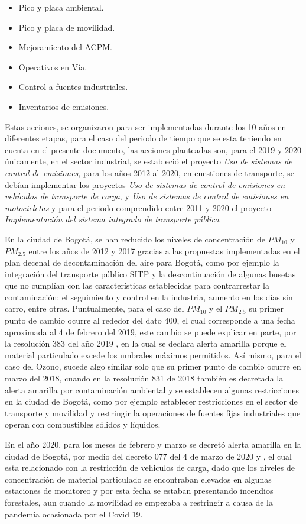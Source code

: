 \begin{itemize}
\item Pico y placa ambiental.
\item Pico y placa de movilidad. 
\item Mejoramiento del ACPM.
\item Operativos en Vía.
\item Control a fuentes industriales.
\item Inventarios de emisiones. 
\end{itemize}

Estas acciones, se organizaron para ser implementadas durante los 10 años en diferentes etapas, para el caso del periodo de tiempo que se esta teniendo en cuenta en el presente documento, las acciones planteadas son, para el 2019 y 2020 únicamente, en el sector industrial, se estableció el proyecto \textit{Uso de sistemas de control
de emisiones}, para los años 2012 al 2020, en cuestiones de transporte, se debían implementar los proyectos \textit{Uso de sistemas de control de emisiones en vehículos de transporte de carga}, y \textit{Uso de sistemas de control 
de emisiones en motocicletas} y para el periodo comprendido entre 2011 y 2020 el proyecto \textit{Implementación del sistema
integrado de transporte
público}. 

En la ciudad de Bogotá, se han reducido los niveles de concentración de $PM_{10}$ y $PM_{2.5}$ entre los años de 2012 y 2017 gracias a las propuestas implementadas en el plan decenal de decontaminación del aire para Bogotá, como por ejemplo la integración del transporte público SITP y la descontinuación de algunas busetas que no cumplían con las características establecidas para contrarrestar la contaminación; el seguimiento y control en la industria, aumento en los días sin carro, entre otras.
Puntualmente, para el caso del $PM_{10}$ y el $PM_{2.5}$ su primer punto de cambio ocurre al rededor del dato 400, el cual corresponde a una fecha aproximada al 4 de febrero del 2019, este cambio se puede explicar en parte, por la resolución 383 del año 2019 \cite{res2019}, en la cual se declara alerta amarilla porque el material particulado excede los umbrales máximos permitidos. Así mismo, para el caso del Ozono, sucede algo similar solo que su primer punto de cambio ocurre en marzo del 2018, cuando en la resolución 831 de 2018 \cite{res2018} también es decretada la alerta amarilla por contaminación ambiental y se establecen algunas restricciones en la ciudad de Bogotá, como por ejemplo establecer  restricciones en el sector de transporte y movilidad y restringir la operaciones de fuentes fijas industriales que operan con combustibles sólidos y líquidos. 

En el año 2020, para los meses de febrero y marzo se decretó  alerta amarilla en la ciudad de Bogotá, por medio del decreto 077 del 4 de marzo de 2020 \cite{dec20202} y \cite{dec2020}, el cual esta relacionado con la restricción de vehiculos de carga, dado que los niveles de concentración de material particulado se encontraban elevados en algunas estaciones de monitoreo y por esta fecha se estaban presentando incendios forestales, aun cuando la movilidad se empezaba a restringir a causa de la pandemia ocasionada por el Covid 19. 
 
